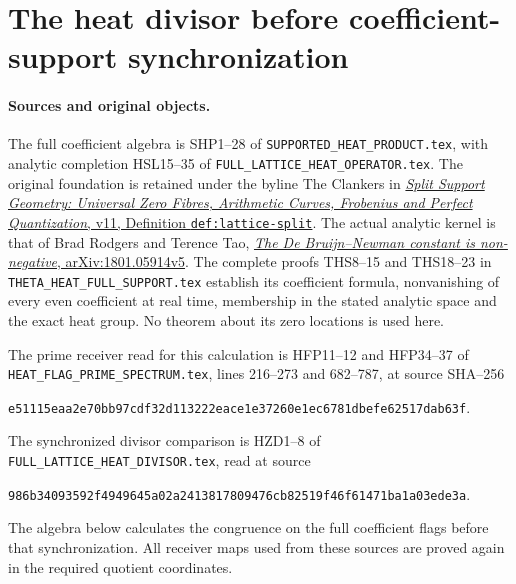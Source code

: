 \section{The heat divisor before coefficient-support synchronization}
\label{sec:coefficient-flag-heat-divisor}

\paragraph{Sources and original objects.}
The full coefficient algebra is SHP1--28 of
\nolinkurl{SUPPORTED_HEAT_PRODUCT.tex}, with analytic completion
HSL15--35 of \nolinkurl{FULL_LATTICE_HEAT_OPERATOR.tex}.
The original foundation is retained under the byline The Clankers in
\href{https://github.com/KokunoYumeto/zeta-function-research-reader/blob/a2851f9eb352e7e4376bc629de86fa4ed9c1c434/workbenches/splitzero-tandem/foundations/split-support-geometry-v11/split_support_geometry_arithmetic_curve_v11.tex}{\emph{Split
Support Geometry: Universal Zero Fibres, Arithmetic Curves, Frobenius
and Perfect Quantization}, v11, Definition \texttt{def:lattice-split}}.
The actual analytic kernel is that of Brad Rodgers and Terence Tao,
\href{https://arxiv.org/abs/1801.05914v5}{\emph{The De Bruijn--Newman
constant is non-negative}, arXiv:1801.05914v5}.
The complete proofs THS8--15 and THS18--23 in
\nolinkurl{THETA_HEAT_FULL_SUPPORT.tex} establish its coefficient
formula, nonvanishing of every even coefficient at real time,
membership in the stated analytic space and the exact heat group.
No theorem about its zero locations is used here.

The prime receiver read for this calculation is HFP11--12 and
HFP34--37 of \nolinkurl{HEAT_FLAG_PRIME_SPECTRUM.tex}, lines
216--273 and 682--787, at source SHA--256
\begin{center}\small
\nolinkurl{e51115eaa2e70bb97cdf32d113222eace1e37260e1ec6781dbefe62517dab63f}.
\end{center}
The synchronized divisor comparison is HZD1--8 of
\nolinkurl{FULL_LATTICE_HEAT_DIVISOR.tex}, read at source
\begin{center}\small
\nolinkurl{986b34093592f4949645a02a2413817809476cb82519f46f61471ba1a03ede3a}.
\end{center}
The algebra below calculates the congruence on the full
coefficient flags before that synchronization. All receiver
maps used from these sources are proved again in the required
quotient coordinates.

